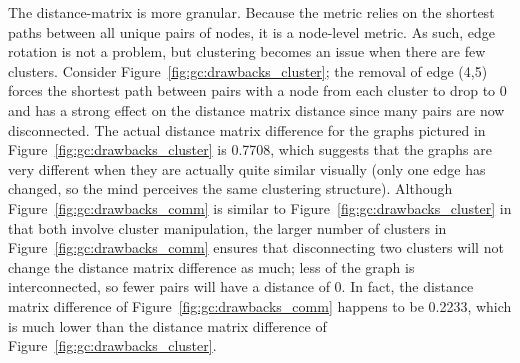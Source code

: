 The distance-matrix is more granular. Because the metric relies on the shortest 
paths between all unique pairs of nodes, it is a node-level metric. As such, 
edge rotation is not 
a problem, but clustering becomes an issue when there are few clusters. 
Consider Figure~\ref{fig:gc:drawbacks_cluster}; the removal of edge (4,5) 
forces the shortest path between pairs with a node from each cluster to drop to 
0 and has a strong effect on the distance matrix distance since many pairs are 
now disconnected. 
The actual distance matrix difference for the graphs pictured in 
Figure~\ref{fig:gc:drawbacks_cluster} is 0.7708, which suggests that the graphs 
are very different when they are actually quite similar visually (only one edge 
has changed, so the mind perceives the same clustering structure). 
Although Figure~\ref{fig:gc:drawbacks_comm} is similar to 
Figure~\ref{fig:gc:drawbacks_cluster} in that both involve cluster 
manipulation, the larger number of clusters in 
Figure~\ref{fig:gc:drawbacks_comm} ensures that disconnecting two clusters will 
not change the distance matrix difference as much; less of the graph is 
interconnected, so fewer pairs will have a distance of 0. In fact, the distance 
matrix difference of Figure~\ref{fig:gc:drawbacks_comm} happens to be 0.2233, 
which is much lower than the distance matrix difference of 
Figure~\ref{fig:gc:drawbacks_cluster}. 









